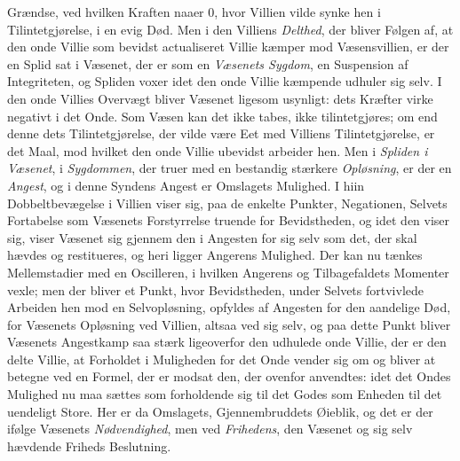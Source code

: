 Grændse, ved hvilken Kraften naaer 0, hvor Villien vilde synke hen i
Tilintetgjørelse, i en evig Død. Men i den Villiens \emph{Delthed}, der bliver
Følgen af, at den onde Villie som bevidst actualiseret Villie kæmper mod
Væsensvillien, er der en Splid sat i Væsenet, der er som en \emph{Væsenets
Sygdom}, en Suspension af Integriteten, og Spliden voxer idet den onde Villie
kæmpende udhuler sig selv. I den onde Villies Overvægt bliver Væsenet ligesom
usynligt: dets Kræfter virke negativt i det Onde. Som Væsen kan det ikke tabes,
ikke tilintetgjøres; om end denne dets Tilintetgjørelse, der vilde være Eet med
Villiens Tilintetgjørelse, er det Maal, mod hvilket den onde Villie ubevidst
arbeider hen. Men i \emph{Spliden i Væsenet}, i \emph{Sygdommen}, der truer med
en bestandig stærkere \emph{Opløsning}, er der en \emph{Angest}, og i denne
Syndens Angest er Omslagets Mulighed. I hiin Dobbeltbevægelse i Villien viser
sig, paa de enkelte Punkter, Negationen, Selvets Fortabelse som Væsenets
Forstyrrelse truende for Bevidstheden, og idet den viser sig, viser Væsenet sig
gjennem den i Angesten for sig selv som det, der skal hævdes og restitueres, og
heri ligger Angerens Mulighed. Der kan nu tænkes Mellemstadier med en Oscilleren,
i hvilken Angerens og Tilbagefaldets Momenter vexle; men der bliver et Punkt,
hvor Bevidstheden, under Selvets fortvivlede Arbeiden hen mod en Selvopløsning,
opfyldes af Angesten for den aandelige Død, for Væsenets
 Opløsning ved Villien, altsaa ved sig selv, og paa dette Punkt bliver Væsenets
Angestkamp saa stærk ligeoverfor den udhulede onde Villie, der er den delte
Villie, at Forholdet i Muligheden for det Onde vender sig om og bliver at
betegne ved en Formel, der er modsat den, der ovenfor anvendtes: idet det Ondes
Mulighed nu maa sættes som forholdende sig til det Godes som Enheden til det
uendeligt Store. Her er da Omslagets, Gjennembruddets Øieblik, og det er der
ifølge Væsenets \emph{Nødvendighed}, men ved \emph{Frihedens}, den Væsenet og sig
selv hævdende Friheds Beslutning.

